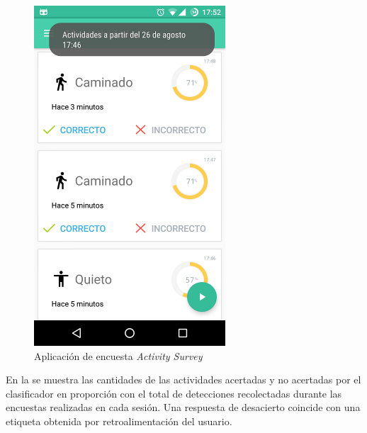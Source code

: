 \begin{figure}[H]
\begin{centering}
\includegraphics[width=0.8\columnwidth]{capitulo-6/graphics/activities_toast}
\par\end{centering}
\caption{\label{fig6:activity-survey}Aplicación de encuesta\emph{ Activity
Survey}}

\end{figure}

En la  se muestra las cantidades de las actividades
acertadas y no acertadas por el clasificador  en proporción
con el total de detecciones recolectadas durante las encuestas realizadas
en cada sesión. Una respuesta de desacierto coincide con una etiqueta
obtenida por retroalimentación del usuario.

